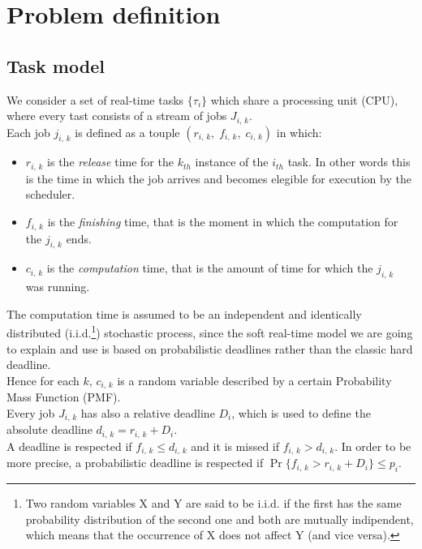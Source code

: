\chapter{Problem definition}\label{chp:model}


\section{Task model}
We consider a set of real-time tasks \( \{\tau_{i}\} \) which share a processing unit (CPU), where every tast consists of a stream of jobs \( J_{i,\,k} \).\\
Each job \( j_{i,\,k} \) is defined as a touple \( \left(r_{i,\,k}, \;f_{i,\,k}, \;c_{i,\,k}\right) \) in which:
\begin{itemize}
  \item \( r_{i,\,k} \) is the \emph{release} time for the \( k_{th} \) instance of the \( i_{th} \) task. In other words this is the time in which the job arrives and becomes elegible for execution by the scheduler.
  \item \( f_{i,\,k} \) is the \emph{finishing} time, that is the moment in which the computation for the \( j_{i,\,k} \) ends.
  \item \( c_{i,\,k} \) is the \emph{computation} time, that is the amount of time for which the \( j_{i,\,k} \) was running.
\end{itemize} 

The computation time is assumed to be an independent and identically distributed (i.i.d.\footnote{Two random variables X and Y are said to be i.i.d. if the first has the same probability distribution of the second one and both are mutually indipendent, which means that the occurrence of X does not affect Y (and vice versa).}) stochastic process, since the soft real-time model we are going to explain and use is based on probabilistic deadlines rather than the classic hard deadline.\\
Hence for each \( k \), \( c_{i,\,k} \) is a random variable described by a certain Probability Mass Function (PMF).\\
Every job \( J_{i,\,k} \) has also a relative deadline \( D_{i} \), which is used to define the absolute deadline \( d_{i,\,k} = r_{i,\,k} + D_{i} \). \\
A deadline is respected if \( f_{i,\,k} \leq d_{i,\,k} \) and it is missed if \( f_{i,\,k} > d_{i,\,k} \). In order to be more precise, a probabilistic deadline is respected if \( \Pr\{f_{i,\,k} > r_{i,\,k} + D_{i} \} \leq p_{i} \).

